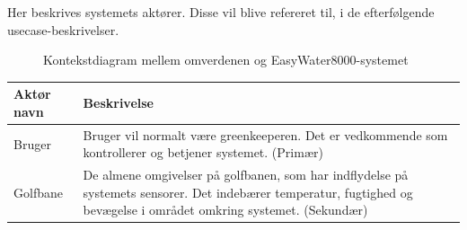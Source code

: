 Her beskrives systemets aktører. Disse vil blive refereret til, i de efterfølgende usecase-beskrivelser.


\begin{figure}[htbp] \centering
{}
\caption{Kontekstdiagram mellem omverdenen og EasyWater8000-systemet}
\label{lab:kontekstdiagram}
\end{figure}

\begin{table}[!htbp] \centering
	\begin{tabular}{|p{2.5cm}|p{11.5cm}|}
	\hline
		\textbf{Aktør navn} & \textbf{Beskrivelse} \\\hline
		Bruger & Bruger vil normalt være greenkeeperen. Det er vedkommende som kontrollerer og betjener systemet. (Primær) \\\hline

		Golfbane & De almene omgivelser på golfbanen, som har indflydelse på systemets sensorer. Det indebærer temperatur, fugtighed og bevægelse i området omkring systemet. (Sekundær) \\\hline
	\end{tabular}
\end{table}

